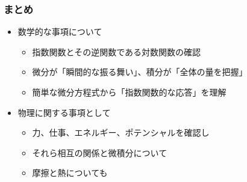 \documentclass[unicode,12pt,aspectratio=169]{beamer}
\begin{document}
\begin{frame}
	\frametitle{まとめ}
		\begin{boxnote}
			\begin{itemize}
				\item 数学的な事項について
					\begin{itemize}
						\item 指数関数とその逆関数である対数関数の確認
						\item 微分が「瞬間的な振る舞い」、積分が「全体の量を把握」
						\item 簡単な微分方程式から「指数関数的な応答」を理解
					\end{itemize}
				\item 物理に関する事項として
					\begin{itemize}
						\item 力、仕事、エネルギー、ポテンシャルを確認し
						\item それら相互の関係と微積分について
						\item 摩擦と熱についても
					\end{itemize}
			\end{itemize}
		\end{boxnote}
\end{frame}

\end{document}
